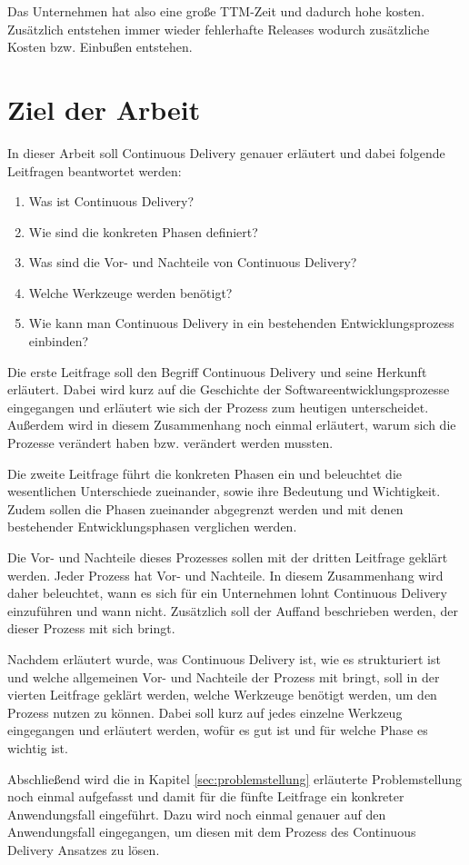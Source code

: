 Das Unternehmen hat also eine große TTM-Zeit und dadurch hohe kosten. Zusätzlich entstehen immer wieder fehlerhafte Releases wodurch zusätzliche Kosten bzw. Einbußen entstehen.

\section{Ziel der Arbeit}
\label{sec:zielDerArbeit}
In dieser Arbeit soll Continuous Delivery genauer erläutert und dabei folgende Leitfragen beantwortet werden:

\begin{enumerate}
	\item Was ist Continuous Delivery?
	\item Wie sind die konkreten Phasen definiert?
	\item Was sind die Vor- und Nachteile von Continuous Delivery?
	\item Welche Werkzeuge werden benötigt?
	\item Wie kann man Continuous Delivery in ein bestehenden Entwicklungsprozess einbinden?
\end{enumerate}

Die erste Leitfrage soll den Begriff Continuous Delivery und seine Herkunft erläutert. Dabei wird kurz auf die Geschichte der Softwareentwicklungsprozesse eingegangen und erläutert wie sich der Prozess zum heutigen unterscheidet. Außerdem wird in diesem Zusammenhang noch einmal erläutert, warum sich die Prozesse verändert haben bzw. verändert werden mussten.

Die zweite Leitfrage führt die konkreten Phasen ein und beleuchtet die wesentlichen Unterschiede zueinander, sowie ihre Bedeutung und Wichtigkeit. Zudem sollen die Phasen zueinander abgegrenzt werden und mit denen bestehender Entwicklungsphasen verglichen werden.

Die Vor- und Nachteile dieses Prozesses sollen mit der dritten Leitfrage geklärt werden. Jeder Prozess hat Vor- und Nachteile. In diesem Zusammenhang wird daher beleuchtet, wann es sich für ein Unternehmen lohnt Continuous Delivery einzuführen und wann nicht. Zusätzlich soll der Auffand beschrieben werden, der dieser Prozess mit sich bringt.

Nachdem erläutert wurde, was Continuous Delivery ist, wie es strukturiert ist und welche allgemeinen Vor- und Nachteile der Prozess mit bringt, soll in der vierten Leitfrage geklärt werden, welche Werkzeuge benötigt werden, um den Prozess nutzen zu können. Dabei soll kurz auf jedes einzelne Werkzeug eingegangen und erläutert werden, wofür es gut ist und für welche Phase es wichtig ist.

Abschließend wird die in Kapitel \ref{sec:problemstellung} erläuterte Problemstellung noch einmal aufgefasst und damit für die fünfte Leitfrage ein konkreter Anwendungsfall eingeführt. Dazu wird noch einmal genauer auf den Anwendungsfall eingegangen, um diesen mit dem Prozess des Continuous Delivery Ansatzes zu lösen.